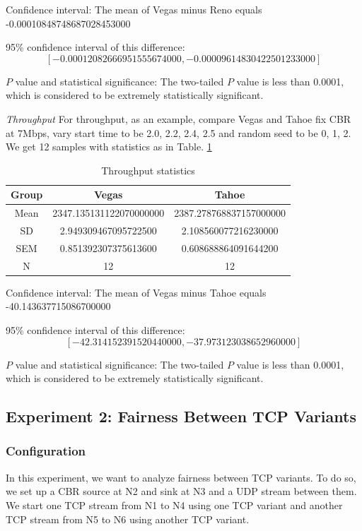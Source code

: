 \documentclass[10pt, conference]{IEEEtran/IEEEtran}
\begin{document}
Confidence interval: 
  The mean of Vegas minus Reno equals -0.00010848748687028453000 
  
  95\% confidence interval of this difference: 
  \[[-0.00012082666951555674000, -0.00009614830422501233000]\]
  
$P$ value and statistical significance: 
  The two-tailed $P$ value is less than 0.0001, which is considered to be extremely statistically significant. 

\textit{Throughput}
 For throughput, as an example, compare Vegas and Tahoe fix CBR at 7Mbps, vary start time to be 2.0, 2.2, 2.4, 2.5 and random seed to be 0, 1, 2.
We get 12 samples with statistics as in Table. \ref{thpt}

\begin{table}[h]
\caption{Throughput statistics}
\begin{center}
\begin{tabular}{|c|c|c|}
Group &	  Vegas  &	  Tahoe \\
\hline
Mean &	2347.135131122070000000&	2387.278768837157000000\\
SD &	2.949309467095722500&	2.108560077216230000\\
SEM	&0.851392307375613600&	0.608688864091644200\\
N	&12 &                   	12                    
\end{tabular}
\end{center}
\label{thpt}
\end{table}%

  Confidence interval: 
  The mean of Vegas minus Tahoe equals -40.143637715086700000 
  
  95\% confidence interval of this difference:
\[[-42.314152391520440000, -37.973123038652960000]\]
  
  
$P$ value and statistical significance: 
  The two-tailed $P$ value is less than 0.0001, which is considered to be extremely statistically significant. 






\subsection{Experiment 2: Fairness Between TCP Variants}
\subsubsection{Configuration}

In this experiment, we want to analyze fairness between TCP variants. To do so, we set up a CBR source at N2 and sink at N3 and a UDP stream between them. We start one TCP stream from N1 to N4 using one TCP
variant and another TCP stream from N5 to N6 using another TCP variant.
\end{document}
